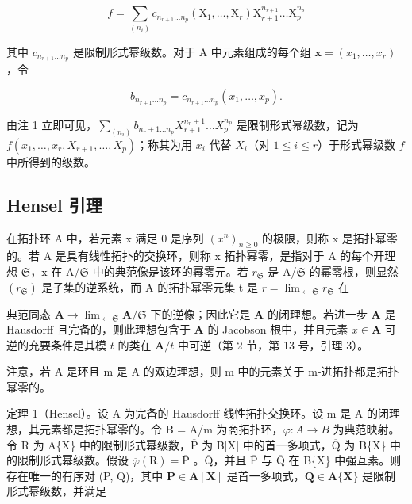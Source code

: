 \[
f = \sum_ {(n _ {i})} c _ {n _ {r + 1} \dots n _ {p}} (\mathrm{X} _ {1}, \dots , \mathrm{X} _ {r}) \mathrm{X} _ {r + 1} ^ {n _ {r + 1}} \dots \mathrm{X} _ {p} ^ {n _ {p}}
\]

其中 \(c_{n_{r+1}\ldots n_p}\) 是限制形式幂级数。对于 A 中元素组成的每个组 \(\mathbf{x} = (x_1, \ldots, x_r)\)，令

\[
b _ {n _ {r + 1} \dots n _ {p}} = c _ {n _ {r + 1} \dots n _ {p}} (x _ {1}, \dots , x _ {p}).
\]

由注 1 立即可见，\(\sum_{(n_i)} b_{n_r+1 \ldots n_p} X_{r+1}^{n_r+1} \ldots X_p^{n_p}\) 是限制形式幂级数，记为 \(f(x_1, \ldots, x_r, X_{r+1}, \ldots, X_p)\)；称其为用 \(x_i\) 代替 \(X_i\)（对 \(1 \leqslant i \leqslant r\)）于形式幂级数 \(f\) 中所得到的级数。

\subsection{Hensel 引理}

在拓扑环 A 中，若元素 x 满足 0 是序列 \((x^{n})_{n\geqslant0}\) 的极限，则称 x 是拓扑幂零的。若 A 是具有线性拓扑的交换环，则称 x 拓扑幂零，是指对于 A 的每个开理想 \(\mathfrak{S}\)，x 在 A/\(\mathfrak{S}\) 中的典范像是该环的幂零元。若 \(r_{\mathfrak{S}}\) 是 A/\(\mathfrak{S}\) 的幂零根，则显然 \((r_{\mathfrak{S}})\) 是子集的逆系统，而 A 的拓扑幂零元集 t 是 \(r=\lim_{\leftarrow \mathfrak{S}}r_{\mathfrak{S}}\) 在

典范同态 \(\mathbf{A} \to \lim_{\leftarrow \mathfrak{S}} \mathbf{A} / \mathfrak{S}\) 下的逆像；因此它是 \(\mathbf{A}\) 的闭理想。若进一步 \(\mathbf{A}\) 是 Hausdorff 且完备的，则此理想包含于 \(\mathbf{A}\) 的 Jacobson 根中，并且元素 \(x \in \mathbf{A}\) 可逆的充要条件是其模 \(t\) 的类在 \(\mathbf{A} / t\) 中可逆（第 2 节，第 13 号，引理 3）。

注意，若 A 是环且 m 是 A 的双边理想，则 m 中的元素关于 m-进拓扑都是拓扑幂零的。

定理 1（Hensel）。设 A 为完备的 Hausdorff 线性拓扑交换环。设 m 是 A 的闭理想，其元素都是拓扑幂零的。令 B = A/m 为商拓扑环，\(\varphi: A \to B\) 为典范映射。令 R 为 A\{X\} 中的限制形式幂级数，\(\overline{\mathrm{P}}\) 为 B{[}X{]} 中的首一多项式，\(\overline{\mathrm{Q}}\) 为 B\{X\} 中的限制形式幂级数。假设 \(\overline{\varphi}(\mathrm{R}) = \overline{\mathrm{P}}\) 。\(\overline{\mathrm{Q}}\)，并且 \(\overline{\mathrm{P}}\) 与 \(\overline{\mathrm{Q}}\) 在 B\{X\} 中强互素。则存在唯一的有序对 (P, Q)，其中 \(\mathbf{P} \in \mathbf{A}[\mathbf{X}]\) 是首一多项式，\(\mathbf{Q} \in \mathbf{A}\{\mathbf{X}\}\) 是限制形式幂级数，并满足

